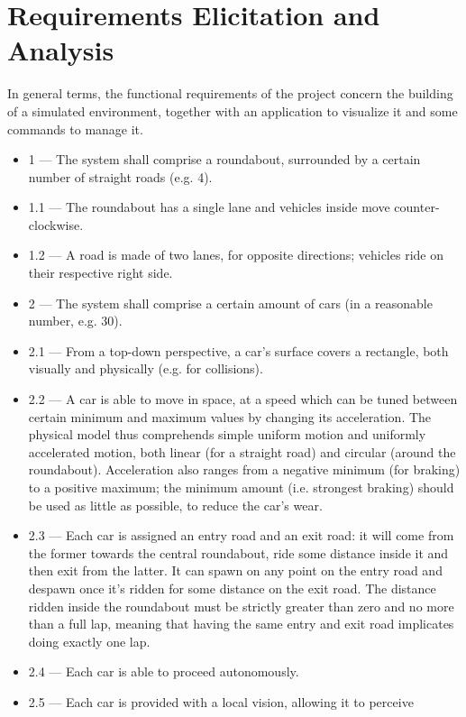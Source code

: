 \section{Requirements Elicitation and Analysis}\label{req:requirements}

In general terms, the functional requirements of the project concern the
building of a simulated environment, together with an application to visualize
it and some commands to manage it.

\begin{itemize}
  \item 1 --- The system shall comprise a roundabout, surrounded by a certain
  number of straight roads (e.g. 4).
  \item 1.1 --- The roundabout has a single lane and vehicles inside move
  counter-clockwise.
  \item 1.2 --- A road is made of two lanes, for opposite directions; vehicles
  ride on their respective right side.
  \item 2 --- The system shall comprise a certain amount of cars (in a reasonable
  number, e.g. 30).
  \item 2.1 --- From a top-down perspective, a car's surface covers a rectangle,
  both visually and physically (e.g. for collisions).
  \item 2.2\label{req:req_22} --- A car is able to move in space, at a speed
  which can be tuned between certain minimum and maximum values by changing its
  acceleration. The physical model thus comprehends simple uniform motion and
  uniformly accelerated motion, both linear (for a straight road) and circular
  (around the roundabout). Acceleration also ranges from a negative minimum (for
  braking) to a positive maximum; the minimum amount (i.e. strongest braking)
  should be used as little as possible, to reduce the car's wear.
  \item 2.3 --- Each car is assigned an entry road and an exit road: it
  will come from the former towards the central roundabout, ride some distance
  inside it and then exit from the latter. It can spawn on any point on the
  entry road and despawn once it's ridden for some distance on the exit road.
  The distance ridden inside the roundabout must be strictly greater than zero
  and no more than a full lap, meaning that having the same entry and exit road
  implicates doing exactly one lap.
  \item 2.4 --- Each car is able to proceed autonomously.
  \item 2.5 --- Each car is provided with a local vision, allowing it to perceive

\end{itemize}

